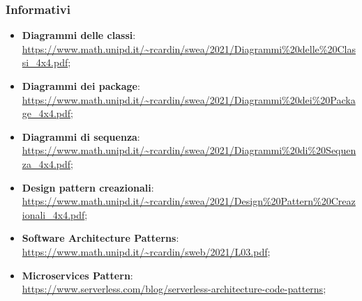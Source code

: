 \subsubsection{Informativi}
\begin{itemize}
	\item \textbf{Diagrammi delle classi}:\\  \url{https://www.math.unipd.it/~rcardin/swea/2021/Diagrammi\%20delle\%20Classi_4x4.pdf};
	\item \textbf{Diagrammi dei package}:\\  \url{https://www.math.unipd.it/~rcardin/swea/2021/Diagrammi\%20dei\%20Package_4x4.pdf};
	\item \textbf{Diagrammi di sequenza}:\\  \url{https://www.math.unipd.it/~rcardin/swea/2021/Diagrammi\%20di\%20Sequenza_4x4.pdf};
	
	\item \textbf{Design pattern creazionali}:\\  \url{https://www.math.unipd.it/~rcardin/swea/2021/Design\%20Pattern\%20Creazionali_4x4.pdf};
	
	\item \textbf{Software Architecture Patterns}:\\  \url{https://www.math.unipd.it/~rcardin/sweb/2021/L03.pdf};
	
	\item \textbf{Microservices Pattern}:\\  \url{https://www.serverless.com/blog/serverless-architecture-code-patterns};
	
	
	
	
	
	
	
	
\end{itemize}

